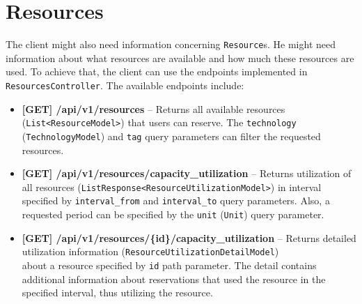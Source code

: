 \section{Resources}
The client might also need information concerning \texttt{Resource}s. He might need information about what resources are available and how much these resources are used.
To achieve that, the client can use the endpoints implemented in \texttt{ResourcesController}.
The available endpoints include:
\begin{itemize}
    \item \textbf{[GET] /api/v1/resources} -- Returns all available resources (\texttt{List\-<ResourceModel>}) that users can reserve. The \texttt{technology} (\texttt{Tech\-nologyModel}) and \texttt{tag} query parameters can filter the requested resources.
    \item \textbf{[GET] /api/v1/resources/capacity\_utilization} -- Returns utilization of all resources (\texttt{ListResponse<ResourceUtilizationModel>}) in interval specified by \texttt{interval\_from} and \texttt{interval\_to} query parameters. Also, a requested period can be specified by the \texttt{unit} (\texttt{Unit}) query parameter.
    \item \textbf{[GET] /api/v1/resources/\{id\}/capacity\_utilization} -- Returns detailed utilization information (\texttt{ResourceUtilizationDetailModel}) \\about a resource specified by \texttt{id} path parameter. The detail contains additional information about reservations that used the resource in the specified interval, thus utilizing the resource.
\end{itemize}
